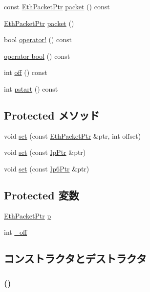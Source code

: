 \begin{DoxyCompactItemize}
\item 
const \hyperlink{classRefCountingPtr}{EthPacketPtr} \hyperlink{classNet_1_1TcpPtr_a13e32a6fa7b2f1b41d1d8dc32d8fda9e}{packet} () const 
\item 
\hyperlink{classRefCountingPtr}{EthPacketPtr} \hyperlink{classNet_1_1TcpPtr_a549ac5c293e8047f1be38ca356e160da}{packet} ()
\item 
bool \hyperlink{classNet_1_1TcpPtr_ac8b1d32dbd52d431450c70b151cfa205}{operator!} () const 
\item 
\hyperlink{classNet_1_1TcpPtr_aa385aa18f5e42db5a415c25a90f4193d}{operator bool} () const 
\item 
int \hyperlink{classNet_1_1TcpPtr_a81fa7ab0c6e92d4496ee915a8a3705f9}{off} () const 
\item 
int \hyperlink{classNet_1_1TcpPtr_ae6fc8073bc02ff3fd03030e0936d56eb}{pstart} () const 
\end{DoxyCompactItemize}
\subsection*{Protected メソッド}
\begin{DoxyCompactItemize}
\item 
void \hyperlink{classNet_1_1TcpPtr_a777f6c709e0743045ba3536e4e184d09}{set} (const \hyperlink{classRefCountingPtr}{EthPacketPtr} \&ptr, int offset)
\item 
void \hyperlink{classNet_1_1TcpPtr_a0a0778623a259833ee4dc0317212ffec}{set} (const \hyperlink{classNet_1_1IpPtr}{IpPtr} \&ptr)
\item 
void \hyperlink{classNet_1_1TcpPtr_aff41448998f095ea26efa08f89bb1c7d}{set} (const \hyperlink{classNet_1_1Ip6Ptr}{Ip6Ptr} \&ptr)
\end{DoxyCompactItemize}
\subsection*{Protected 変数}
\begin{DoxyCompactItemize}
\item 
\hyperlink{classRefCountingPtr}{EthPacketPtr} \hyperlink{classNet_1_1TcpPtr_a764b18a7236ca83fd4bd750516da7d09}{p}
\item 
int \hyperlink{classNet_1_1TcpPtr_ae333e6fee474f238b35b4bf86e60a8ee}{\_\-off}
\end{DoxyCompactItemize}


\subsection{コンストラクタとデストラクタ}
\hypertarget{classNet_1_1TcpPtr_ac6e8d0bb54cb7e4603a42ea0db870e32}{
\subsubsection[{TcpPtr}]{ ()}}
\label{classNet_1_1TcpPtr_ac6e8d0bb54cb7e4603a42ea0db870e32}




